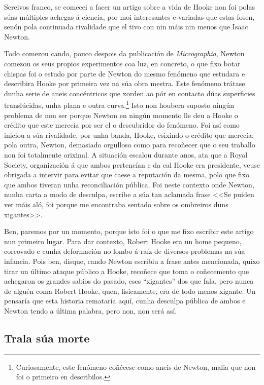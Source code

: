 \begin{refsection}
\begin{multicols}{2}
Sereivos franco, se comecei a facer un artigo sobre a vida de Hooke non foi
polas súas múltiples achegas á ciencia, por moi interesantes e variadas que
estas fosen, senón pola continuada rivalidade que el tivo con nin máis nin
menos que Isaac Newton.

Todo comezou cando, pouco despois da publicación de \textit{Micrographia},
Newton comezou os seus propios experimentos coa luz, en concreto, o que fixo
botar chispas foi o estudo por parte de Newton do mesmo fenómeno que estudara e
describira Hooke por primeira vez na súa obra mestra. Este fenómeno trátase
dunha serie de aneis concéntricos que xorden ao pór en contacto dúas
superficies translúcidas, unha plana e outra curva.\footnote{Curiosamente, este
fenómeno coñécese como aneis de Newton, malia que non foi o primeiro en
describilos.} Isto non houbera suposto ningún problema de non ser porque Newton
en ningún momento lle deu a Hooke o crédito que este merecía por ser el o
descubridor do fenómeno. Foi así como iniciou a súa rivalidade, por unha banda,
Hooke, esixindo o crédito que merecía; pola outra, Newton, demasiado orgulloso
como para recoñecer que o seu traballo non foi totalmente orixinal. A situación
escalou durante anos, ata que a Royal Society, organización á que ambos
pertencían e da cal Hooke era presidente, veuse obrigada a intervir para evitar
que caese a reputación da mesma, polo que fixo que ambos tiveran unha
reconciliación pública. Foi neste contexto onde Newton, nunha carta a modo de
desculpa, escribe a súa tan aclamada frase <<Se puiden ver máis aló, foi porque
me encontraba sentado sobre os ombreiros duns xigantes>>.

Ben, paremos por un momento, porque isto foi o que me fixo escribir este artigo
nun primeiro lugar. Para dar contexto, Robert Hooke era un home pequeno,
corcovado e cunha deformación no lombo á raíz de diversos problemas na súa
infancia. Pois ben, disque, cando Newton escribiu a frase antes mencionada,
quixo tirar un último ataque público a Hooke, recoñece que toma o coñecemento
que achegaron os grandes sabios do pasado, eses ``xigantes'' dos que fala, pero
nunca de alguén coma Robert Hooke, quen, fisicamente, era de todo menos
xigante. Un pensaría que esta historia remataría aquí, cunha desculpa pública
de ambos e Newton tendo a última palabra, pero non, non será así.

\subsection*{Trala súa morte}


\end{multicols}
\end{refsection}
